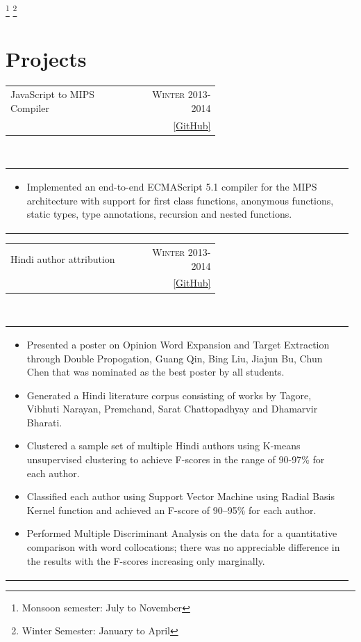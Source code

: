 \documentclass[a4paper]{article} %
\newcommand{\verticalspacing}{-0.25cm}
\newcommand{\bulletspace}{0.7cm}
\newcommand{\projectheadspacing}{6.9cm}
\newcommand{\cproject}[5]{%
    \begin{tabular}{p{0.60\linewidth}r}
        \textcolor{NavyBlue}{\small #2} & \multicolumn{1}{m{ \projectheadspacing{} }}{\raggedleft \small {\textsc{#1}}}\\
        \small {#3} & \small {#4}
    \end{tabular}\\
    \begin{tabular}{p{0.98\linewidth}}
    \vspace{-0.3cm}
        \small{#5}
    \end{tabular}
    \vspace{\verticalspacing{}}
}
\begin{document}
\vspace{-0.65cm}
\let\thefootnote\relax\footnote{Monsoon semester: July to November}
\let\thefootnote\relax\footnote{Winter Semester: January to April}
\section{Projects}

\cproject
    {Winter 2013-2014}
    {JavaScript to MIPS Compiler}
    {\textsc{\raggedright Compilers}, Professor Subhajit Roy}
    {\href{https://github.com/srijanshetty/javascript-compiler} {[GitHub]}}
    {%
        \begin{itemize}[leftmargin=\bulletspace{}]
            \item Implemented an end-to-end ECMAScript 5.1 compiler for the MIPS architecture with support for first class
                functions, anonymous functions, static types, type annotations, recursion and nested functions.
        \end{itemize}
    }

\cproject
    {Winter 2013-2014}
    {Hindi author attribution}
    {\textsc{\raggedright Artificial Intelligence}, Professor Amitabha Mukherjee}
    {\href{https://github.com/srijanshetty/author-attribution} {[GitHub]}}
    {%
        \begin{itemize}[leftmargin=\bulletspace{}]
            \item Presented a poster on Opinion Word Expansion and Target Extraction through Double Propogation, Guang Qin,
                Bing Liu, Jiajun Bu, Chun Chen that was nominated as the best poster by all students.
            \item Generated a Hindi literature corpus consisting of works by Tagore,
                Vibhuti Narayan, Premchand, Sarat Chattopadhyay and Dhamarvir Bharati.
            \item Clustered a sample set of multiple Hindi authors using K-means unsupervised clustering to achieve
                F-scores in the range of 90-97\% for each author.
            \item Classified each author using Support Vector Machine using Radial Basis Kernel function
                and achieved an F-score of 90--95\% for each author.
            \item Performed Multiple Discriminant Analysis on the data for a quantitative comparison with word
                collocations; there was no appreciable difference in the results with the F-scores increasing only
                marginally.
        \end{itemize}
    }
\end{document}
